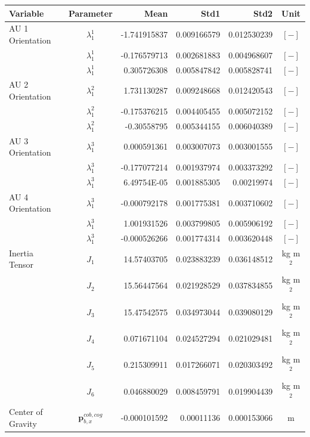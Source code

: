\begin{table}[H]
\begin{tabular}{lcrrrc}
Variable & Parameter & Mean & Std1 & Std2 & Unit \\
\hline \hline
AU 1 Orientation & $\lambda_1^1$ & -1.741915837 & 0.009166579 & 0.012530239 & $[-]$ \\
                 & $\lambda_1^1$ & -0.176579713 & 0.002681883 & 0.004968607 & $[-]$ \\
                 & $\lambda_1^1$ & 0.305726308 & 0.005847842 & 0.005828741 & $[-]$ \\
AU 2 Orientation & $\lambda_1^2$ & 1.731130287 & 0.009248668 & 0.012420543 & $[-]$ \\
                 & $\lambda_1^2$ & -0.175376215 & 0.004405455 & 0.005072152 & $[-]$ \\
                 & $\lambda_1^2$ & -0.30558795 & 0.005344155 & 0.006040389 & $[-]$ \\
AU 3 Orientation & $\lambda_1^3$ & 0.000591361 & 0.003007073 & 0.003001555 & $[-]$ \\
                 & $\lambda_1^3$ & -0.177077214 & 0.001937974 & 0.003373292 & $[-]$ \\
                 & $\lambda_1^3$ & 6.49754E-05 & 0.001885305 & 0.00219974 & $[-]$ \\
AU 4 Orientation & $\lambda_1^3$ & -0.000792178 & 0.001775381 & 0.003710602 & $[-]$ \\
                 & $\lambda_1^3$ & 1.001931526 & 0.003799805 & 0.005906192 & $[-]$ \\
                 & $\lambda_1^3$ & -0.000526266 & 0.001774314 & 0.003620448 & $[-]$ \\
\hline
Inertia Tensor & $J_1$ & 14.57403705 & 0.023883239 & 0.036148512 & kg m$^2$ \\
               & $J_2$ & 15.56447564 & 0.021928529 & 0.037834855 & kg m$^2$ \\
               & $J_3$ & 15.47542575 & 0.034973044 & 0.039080129 & kg m$^2$ \\
               & $J_4$ & 0.071671104 & 0.024527294 & 0.021029481 & kg m$^2$ \\
               & $J_5$ & 0.215309911 & 0.017266071 & 0.020303492 & kg m$^2$ \\
               & $J_6$ & 0.046880029 & 0.008459791 & 0.019904439 & kg m$^2$ \\
\hline
Center of Gravity & $\mathbf{p}_{b,x}^{cob,cog}$ & -0.000101592 & 0.00011136 & 0.000153066 & m \\

\end{tabular}
\end{table}
